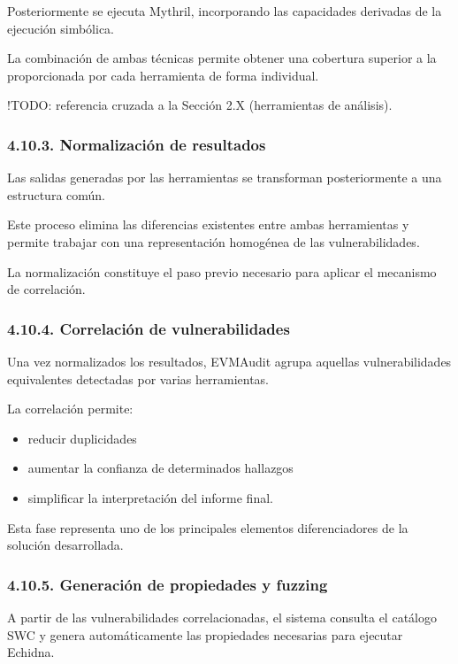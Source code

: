 Posteriormente se ejecuta Mythril, incorporando las capacidades
derivadas de la ejecución simbólica.

La combinación de ambas técnicas permite obtener una cobertura superior
a la proporcionada por cada herramienta de forma individual.

!TODO: referencia cruzada a la Sección 2.X (herramientas de análisis).

\subsubsection{4.10.3. Normalización de
resultados}\label{normalizaciuxf3n-de-resultados}

Las salidas generadas por las herramientas se transforman posteriormente
a una estructura común.

Este proceso elimina las diferencias existentes entre ambas herramientas
y permite trabajar con una representación homogénea de las
vulnerabilidades.

La normalización constituye el paso previo necesario para aplicar el
mecanismo de correlación.

\subsubsection{4.10.4. Correlación de
vulnerabilidades}\label{correlaciuxf3n-de-vulnerabilidades}

Una vez normalizados los resultados, EVMAudit agrupa aquellas
vulnerabilidades equivalentes detectadas por varias herramientas.

La correlación permite:

\begin{itemize}
\tightlist
\item
  reducir duplicidades
\item
  aumentar la confianza de determinados hallazgos
\item
  simplificar la interpretación del informe final.
\end{itemize}

Esta fase representa uno de los principales elementos diferenciadores de
la solución desarrollada.

\subsubsection{4.10.5. Generación de propiedades y
fuzzing}\label{generaciuxf3n-de-propiedades-y-fuzzing}

A partir de las vulnerabilidades correlacionadas, el sistema consulta el
catálogo SWC y genera automáticamente las propiedades necesarias para
ejecutar Echidna.

